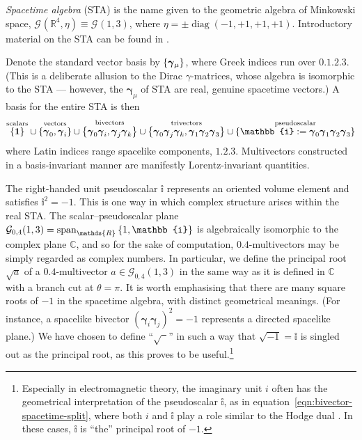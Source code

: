 \documentclass[12pt,a4paper]{article}
\renewcommand{\vb}[1]{\boldsymbol{#1}}
\newcommand{\vg}[1]{\vb{\gamma}_{#1}}
\newcommand{\GA}[1][]{\mathcal{G}_{#1}}
\newcommand{\vol}{\mathbb{i}}
\newcommand{\spanof}[2][]{\operatorname{span}_{#1}\qty{#2}}
\newcommand{\RR}{\mathds{R}}
\newcommand{\CC}{\mathds{C}}
\DeclareMathOperator{\diag}{diag}
\begin{document}
\emph{Spacetime algebra} (STA) is the name given to the geometric algebra of Minkowski space, $\GA(\RR^4, \eta{}) \equiv{} \GA(1,3)$, where $\eta{} = \pm\diag(-1,+1,+1,+1)$.
Introductory material on the STA can be found in \cite{hestenes2003sta,gull1993sta,dressel2015sta}.

Denote the standard vector basis by $\qty{\vb \gamma{}_\mu{}}$, where Greek indices run over $\qty{0,1,2,3}$.
(This is a deliberate allusion to the Dirac $\gamma{}$-matrices, whose algebra is isomorphic to the STA --- however, the $\vg \mu{}$ of STA are real, genuine spacetime vectors.)
A basis for the entire STA is then
\begin{align*}
	\overset{\text{scalars}}{\qty{\vb 1}}
\cup{}	\overset{\text{vectors}}{\qty{\vg 0, \vg i}}
\cup{}	\overset{\text{bivectors}}{\qty{\vg 0\vg i, \vg j\vg k}}
\cup{}	\overset{\substack{\text{trivectors}}}{\qty{\vg 0\vg j\vg k, \vg 1\vg 2\vg 3}}
\cup{}	\overset{\substack{\text{pseudoscalar}}}{\qty{\vol :={} \vg0\vg1\vg2\vg3}}
\end{align*}
where Latin indices range spacelike components, $\qty{1,2,3}$.
Multivectors constructed in a basis-invariant manner are manifestly Lorentz-invariant quantities.



The right-handed unit pseudoscalar $\vol$ represents an oriented volume element and satisfies $\vol^2 = -1$.
This is one way in which complex structure arises within the real STA.
The scalar--pseudoscalar plane $\GA[0,4](1,3) = \spanof[\RR]{1, \vol}$ is algebraically isomorphic to the complex plane $\CC$, and so for the sake of computation, $\qty{0, 4}$-multivectors may be simply regarded as complex numbers.
In particular, we define the principal root $\sqrt{a}$ of a $\qty{0,4}$-multivector $a \in \GA[0,4](1,3)$ in the same way as it is defined in $\CC$ with a branch cut at $\theta = \pi{}$.
It is worth emphasising that there are many square roots of $-1$ in the spacetime algebra, with distinct geometrical meanings.
(For instance, a spacelike bivector $(\vg{i}\vg{j})^2 = -1$ represents a directed spacelike plane.)
We have chosen to define ``$\sqrt{\phantom{a}}$'' in such a way that $\sqrt{-1} = \vol$ is singled out as the principal root, as this proves to be useful.\footnote{
	Especially in electromagnetic theory, the imaginary unit $i$ often has the geometrical interpretation of the pseudoscalar $\vol$, as in equation~\eqref{eqn:bivector-spacetime-split}, where both $i$ and $\vol$ play a role similar to the Hodge dual \cite{dressel2015sta}.
	In these cases, $\vol$ is ``the'' principal root of $-1$.
}
\end{document}
